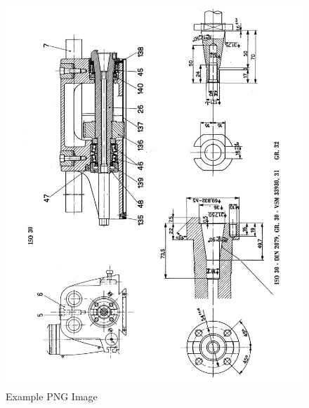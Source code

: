 \newpage
\begin{figure}[h]
    \centering
    \includegraphics[width=1.0\linewidth]{./images/page_23}
    \caption{Example PNG Image}
    \label{fig:horizontal_spindle_dimensions_2}
\end{figure}
